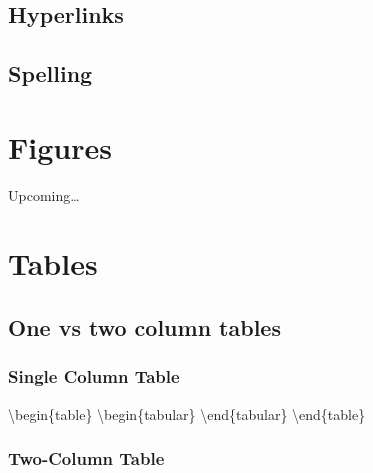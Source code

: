 \documentclass[
  letterpaper,
  DIV=11,
  numbers=noendperiod]{scrreprt}
\newenvironment{Shaded}{\begin{snugshade}}{\end{snugshade}}
\newcommand{\NormalTok}[1]{\textcolor[rgb]{0.00,0.23,0.31}{#1}}
\begin{document}
\section*{Hyperlinks}\label{hyperlinks}


\section*{Spelling}\label{spelling}


\chapter*{Figures}\label{figures}


Upcoming\ldots{}

\chapter*{Tables}\label{tables}


\section*{One vs two column tables}\label{one-vs-two-column-tables}


\subsection*{Single Column Table}\label{single-column-table}

\begin{Shaded}
\begin{Highlighting}[]
\NormalTok{\textbackslash{}begin\{table\}}
\NormalTok{  \textbackslash{}begin\{tabular\}}
\NormalTok{  \textbackslash{}end\{tabular\}}
\NormalTok{\textbackslash{}end\{table\}}
\end{Highlighting}
\end{Shaded}

\subsection*{Two-Column Table}\label{two-column-table}
\end{document}
